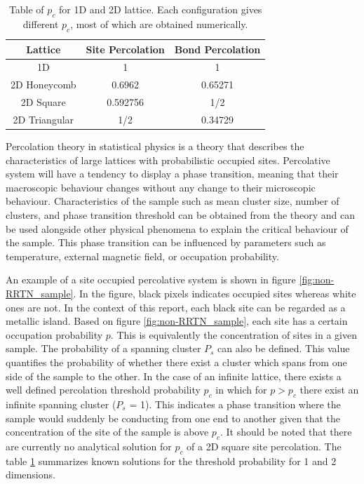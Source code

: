 \documentclass[11pt,a4paper]{report}
\begin{document}
\begin{table}[!b]
\centering
\begin{tabular}{|c|c|c|}
\hline
Lattice       & Site Percolation & Bond Percolation \\ \hline
1D            & 1                & 1                \\ \hline
2D Honeycomb  & 0.6962           & 0.65271          \\ \hline
2D Square     & 0.592756         & 1/2              \\ \hline
2D Triangular & 1/2              & 0.34729          \\ \hline
\end{tabular}%
\caption{Table of $p_c$ for 1D and 2D lattice. Each configuration gives different $p_c$, most of which are obtained numerically.\cite{christensen_2002}}
\label{tab:Percolation_dimension}
\end{table}

Percolation theory in statistical physics is a theory that describes the characteristics of large lattices with probabilistic occupied sites. Percolative system will have a tendency to display a phase transition, meaning that their macroscopic behaviour changes without any change to their microscopic behaviour. Characteristics of the sample such as mean cluster size, number of clusters, and phase transition threshold can be obtained from the theory and can be used alongside other physical phenomena to explain the critical behaviour of the sample. This phase transition can be influenced by parameters such as temperature, external magnetic field, or occupation probability\cite{Stauffer_classical_percolation_2009}. 



An example of a site occupied percolative system is shown in figure \ref{fig:non-RRTN_sample}. In the figure, black pixels indicates occupied sites whereas white ones are not. In the context of this report, each black site can be regarded as a metallic island. Based on figure \ref{fig:non-RRTN_sample}, each site has a certain occupation probability $p$. This is equivalently the concentration of sites in a given sample. The probability of a spanning cluster $P_s$ can also be defined. This value quantifies the probability of whether there exist a cluster which spans from one side of the sample to the other. In the case of an infinite lattice, there exists a well defined percolation threshold probability $p_c$ in which for $p>p_c$ there exist an infinite spanning cluster ($P_s$ = 1). This indicates a phase transition where the sample would suddenly be conducting from one end to another given that the concentration of the site of the sample is above $p_c$. It should be noted that there  are currently no analytical solution for $p_c$ of a 2D square site percolation. The table \ref{tab:Percolation_dimension} summarizes known solutions for the threshold probability for 1 and 2 dimensions. 
\end{document}
